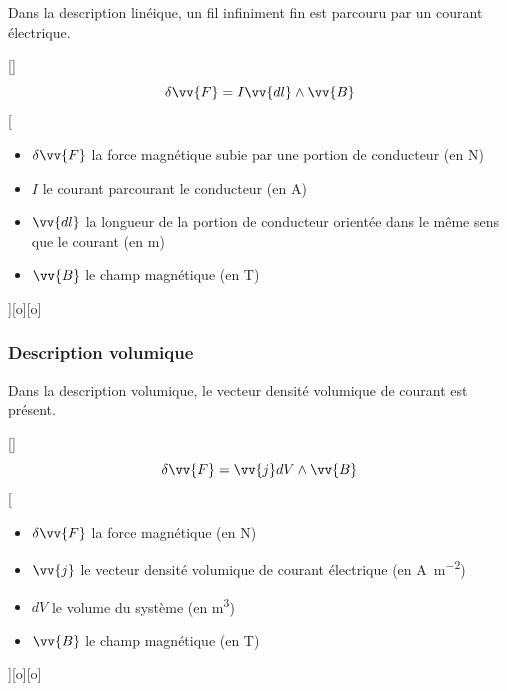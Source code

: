 Dans la description linéique, un fil infiniment fin est parcouru par un courant électrique.

[]
{$$\delta\vv{F}=I\vv{dl}\wedge\vv{B}$$}
[
    \begin{itemize}
        \item $\delta\vv{F}$ la force magnétique subie par une portion de conducteur (en \unit{N})
        \item $I$ le courant parcourant le conducteur (en \unit{A})
        \item $\vv{dl}$ la longueur de la portion de conducteur orientée dans le même sens que le courant (en \unit{m})
        \item $\vv{B}$ le champ magnétique (en \unit{T})
    \end{itemize}
][o][o]



\subsubsection{Description volumique}

Dans la description volumique, le vecteur densité volumique de courant est présent.

[]
{$$\delta\vv{F}=\vv{j}dV\wedge\vv{B}$$}
[
    \begin{itemize}
        \item $\delta\vv{F}$ la force magnétique (en \unit{N})
        \item $\vv{j}$ le vecteur densité volumique de courant électrique (en \unit{A.m^{-2}})
        \item $dV$ le volume du système (en \unit{m^3})
        \item $\vv{B}$ le champ magnétique (en \unit{T})
    \end{itemize}
][o][o]



